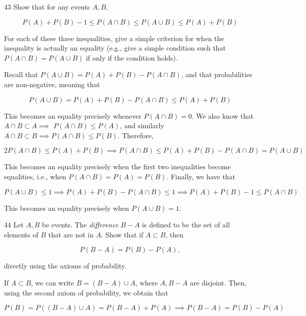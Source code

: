 \newpage

\begin{exercise}{43}
    Show that for any events $A, B$,

    \[P(A) + P(B) - 1 \leq P(A \cap B) \leq P(A \cup B) \leq P(A) + P(B)\]

    For each of these three inequalities, give a simple criterion for when the inequality is actually an equality (e.g., give a simple condition such that $P(A \cap B) = P(A \cup B)$ if only if the condition holds).
\end{exercise}

\begin{solution}
    
    Recall that $P(A \cup B) = P(A) + P(B) - P(A \cap B)$, and that probabilities are non-negative, meaning that

    \[P(A \cup B) = P(A) + P(B) - P(A \cap B) \leq P(A) + P(B)\]

    This becomes an equality precisely whenever $P(A \cap B) = 0$.
    We also know that $A \cap B \subset A \implies$ $P(A \cap B) \leq P(A)$, and similarly $A \cap B \subset B \implies P(A \cap B) \leq P(B)$. Therefore,

    \[2P(A \cap B) \leq P(A) + P(B) \implies P(A \cap B) \leq P(A) + P(B) - P(A \cap B) = P(A \cup B)\]

    This becomes an equality precisely when the first two inequalities become equalities, i.e., when $P(A \cap B) = P(A) = P(B)$.
    Finally, we have that 
    
    \[P(A \cup B) \leq 1 \implies P(A) + P(B) - P(A \cap B) \leq 1 \implies P(A) + P(B) - 1 \leq P(A \cap B)\]

    This becomes an equality precisely when $P(A \cup B) = 1$.
\end{solution}

\begin{exercise}{44}
    Let $A, B$ be events.
    The \textit{difference} $B - A$ is defined to be the set of all elements of $B$ that are not in $A$.
    Show that if $A \subset B$, then

    \[P(B - A) = P(B) - P(A),\]

    directly using the axioms of probability.
\end{exercise}

\begin{solution}

    If $A \subset B$, we can write $B = (B - A) \cup A$, where $A, B - A$ are disjoint.
    Then, using the second axiom of probability, we obtain that

    \[P(B) = P((B - A) \cup A) = P(B - A) + P(A) \implies P(B - A) = P(B) - P(A)\]
\end{solution}

